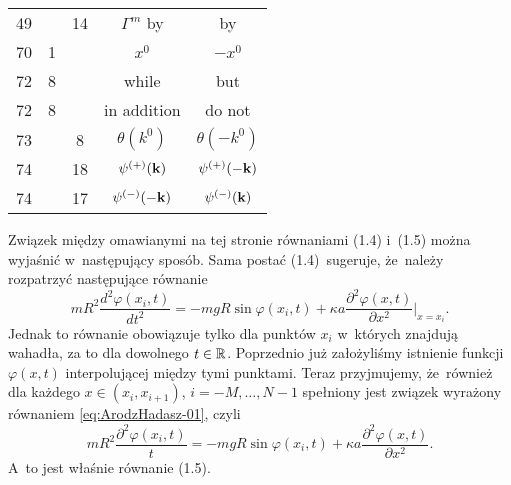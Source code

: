 \documentclass[a4paper,11pt]{article}
\begin{document}
\begin{center}
\begin{tabular}{|c|c|c|c|c|}
    49 & & 14 & $\Gamma^{ m }$ by & by \\
    70 & 1 & & $x^{ 0 }$ & $-x^{ 0 }$ \\
    72 & 8 & & while & but \\
    72 & 8 & & in addition & do not \\
    73 & & 8 & $\theta( k^{ 0 } )$ & $\theta( -k^{ 0 } )$ \\
    74 & & 18 & $\psi^{ ( + ) }( \mathbf{k} )$
           & $\psi^{ ( + ) }( -\mathbf{k} )$ \\
    74 & & 17 & $\psi^{ ( - ) }( -\mathbf{k} )$
           & $\psi^{ ( - ) }( \mathbf{k} )$ \\
    \hline
  \end{tabular}

\end{center}


\vspace{\spaceTwo}














\start {} Związek między omawianymi na tej stronie równaniami
(1.4) i~(1.5) można wyjaśnić w~następujący sposób. Sama postać
(1.4)~sugeruje, że~należy rozpatrzyć następujące równanie
\begin{equation}
  \label{eq:ArodzHadasz-01}
  m R^{ 2 } \frac{ d^{ 2 } \varphi( x_{ i }, t ) }{ dt^{ 2 } } =
  -m g R \sin \varphi( x_{ i }, t )
  + \kappa a \frac{ \partial^{ 2 } \varphi( x, t ) }{ \partial x^{ 2 } }\bigg|_{ x = x_{ i } }.
\end{equation}
Jednak to równanie obowiązuje tylko dla punktów $x_{ i }$ w~których
znajdują wahadła, za to dla dowolnego $t \in \mathbb{R}$. Poprzednio już
założyliśmy istnienie funkcji $\varphi( x , t )$ interpolującej między
tymi punktami. Teraz przyjmujemy, że~również dla każdego
$x \in ( x_{ i }, x_{ i + 1 } )$, $i = -M, \ldots, N - 1$ spełniony jest
związek wyrażony równaniem \eqref{eq:ArodzHadasz-01}, czyli
\begin{equation}
  \label{eq:ArodzHadasz-02}
  m R^{ 2 } \frac{ \partial^{ 2 } \varphi( x_{ i }, t ) }{ t } =
  -m g R \sin \varphi( x_{ i }, t )
  + \kappa a \frac{ \partial^{ 2 } \varphi( x, t ) }{ \partial x^{ 2 } }.
\end{equation}
A~to jest właśnie równanie (1.5).
\end{document}
